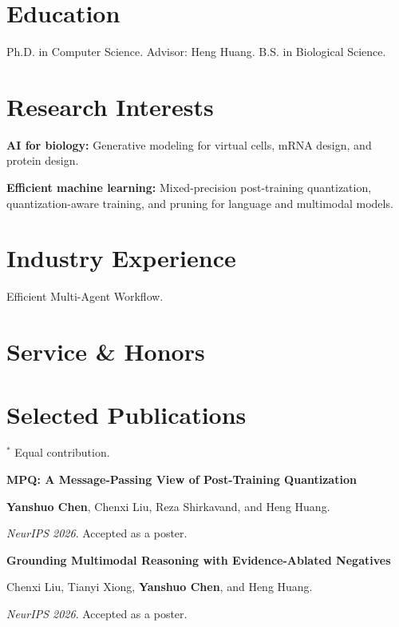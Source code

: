 \documentclass{resume}
\newcommand{\publicationentry}[3]{%
  \par\noindent\begin{minipage}{\linewidth}
    \textbf{#1}\par
    {\fontsize{9}{10.5}\selectfont #2\par}
    {\fontsize{9}{10.5}\selectfont #3\par}
  \end{minipage}\par\vspace{0.25em}
}
\begin{document}

\section{Education}
Ph.D. in Computer Science. Advisor: Heng Huang.
B.S. in Biological Science.

\section{Research Interests}
\textbf{AI for biology:} Generative modeling for virtual cells, mRNA design, and protein design.\par
\textbf{Efficient machine learning:} Mixed-precision post-training quantization, quantization-aware training, and pruning for language and multimodal models.

\section{Industry Experience}
Efficient Multi-Agent Workflow.

\section{Service \& Honors}

\section{Selected Publications}
{\small $^*$ Equal contribution.}\par
\publicationentry
{MPQ: A Message-Passing View of Post-Training Quantization}
{\textbf{Yanshuo Chen}, Chenxi Liu, Reza Shirkavand, and Heng Huang.}
{\textit{NeurIPS 2026}. Accepted as a poster.}

\publicationentry
{Grounding Multimodal Reasoning with Evidence-Ablated Negatives}
{Chenxi Liu, Tianyi Xiong, \textbf{Yanshuo Chen}, and Heng Huang.}
{\textit{NeurIPS 2026}. Accepted as a poster.}
\end{document}
